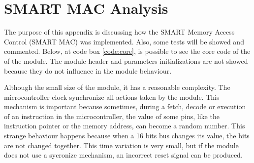 \chapter{SMART MAC Analysis}
\label{cap:apendiceA}

The purpose of this appendix is discussing how the SMART Memory Access Control (SMART MAC) was implemented. Also, some tests will be showed and commented. Below, at code box \ref{code:core}, is possible to see the core code of the of the module. The module header and parameters initializations are not showed because they do not influence in the module behaviour. 

Although the small size of the module, it has a reasonable complexity.  The microcontroller clock synchronize all actions taken by the module.  This mechanism is important because sometimes, during a fetch, decode or execution of an instruction in the microcontroller, the value of some pins, like the instruction pointer or the memory address, can become a random number. This strange behaviour happens because when a 16 bits bus changes its value, the bits are not changed together. This time variation is very small, but if the module does not use a sycronize mechanism, an incorrect reset signal can be produced. 
\newline


